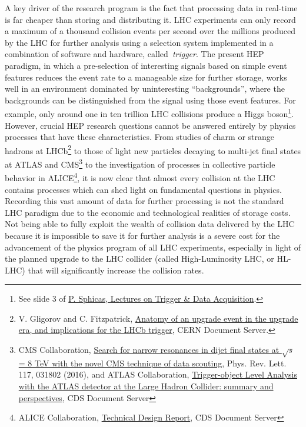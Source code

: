 A key driver of the \acronym research program is the fact that processing data in real-time is far cheaper than storing and distributing it. 
LHC experiments can only record a maximum of a thousand collision events per second over the millions produced by the LHC for further analysis using a selection system 
implemented in a combination of software and hardware, called~\textit{trigger}.
The present HEP paradigm, in which a pre-selection of interesting signals based on simple event features reduces the event rate to a manageable size for further storage, works well in an environment dominated by uninteresting ``backgrounds'', where the backgrounds can be distinguished from the signal using those event features.
For example, only around one in ten trillion LHC collisions produce a Higgs boson\footnote{See slide 3 of \href{https://indico.cern.ch/event/a062849/material/1/1.pdf}{P. Sphicas, Lectures on Trigger \& Data Acquisition}.}.
However, crucial HEP research questions cannot be answered entirely by physics processes that have these characteristics. 
From studies of charm or strange hadrons at LHCb\footnote{V. Gligorov and C. Fitzpatrick, \href{http://cds.cern.ch/record/1670985}{Anatomy of an upgrade event in the upgrade era, and implications for the LHCb trigger}, CERN Document Server.} to those of light new particles decaying to multi-jet final states at ATLAS and CMS\footnote{CMS Collaboration, \href{https://arxiv.org/abs/1604.08907}{Search for narrow resonances in dijet final states at $\sqrt{s}$ = 8 TeV with the novel CMS technique of data scouting}, Phys. Rev. Lett. 117, 031802 (2016), and ATLAS Collaboration, \href{https://cds.cern.ch/record/2295739}{Trigger-object Level Analysis with the ATLAS detector at the Large Hadron Collider: summary and perspectives}, CDS Document Server} to the investigation of processes in collective particle behavior in ALICE\footnote{ALICE Collaboration, \href{https://cds.cern.ch/record/2011297/files/ALICE-TDR-019.pdf}{Technical Design Report}, CDS Document Server}, it is now clear that almost every collision at the LHC contains processes which can shed light on fundamental questions in physics. 
Recording this vast amount of data for further processing is not the standard LHC paradigm due to the economic and technological realities of storage costs.
Not being able to fully exploit the wealth of collision data delivered by the LHC because it is impossible to save it for further analysis is a severe cost for the advancement of the physics program of all LHC experiments, especially in light of the planned upgrade to the LHC collider (called High-Luminosity LHC, or HL-LHC) that will significantly increase the collision rates. 

